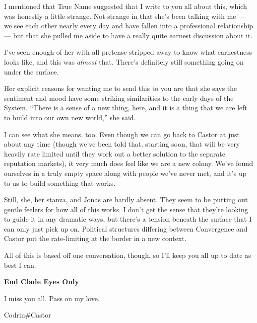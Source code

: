 I mentioned that True Name suggested that I write to you all about this, which was honestly a little strange. Not strange in that she's been talking with me — we see each other nearly every day and have fallen into a professional relationship — but that she pulled me aside to have a really quite earnest discussion about it.

I've seen enough of her with all pretense stripped away to know what earnestness looks like, and this was \emph{almost} that. There's definitely still something going on under the surface.

Her explicit reasons for wanting me to send this to you are that she says the sentiment and mood have some striking similarities to the early days of the System. ``There is a sense of a new thing, here, and it is a thing that we are left to build into our own new world,'' she said.

I can see what she means, too. Even though we can go back to Castor at just about any time (though we've been told that, starting soon, that will be very heavily rate limited until they work out a better solution to the separate reputation markets), it very much does feel like we are a new colony. We've found ourselves in a truly empty space along with people we've never met, and it's up to us to build something that works.

Still, she, her stanza, and Jonas are hardly absent. They seem to be putting out gentle feelers for how all of this works. I don't get the sense that they're looking to guide it in any dramatic ways, but there's a tension beneath the surface that I can only just pick up on. Political structures differing between Convergence and Castor put the rate-limiting at the border in a new context.

All of this is based off one conversation, though, so I'll keep you all up to date as best I can.

\textbf{End Clade Eyes Only}

I miss you all. Pass on my love.

Codrin\#Castor
